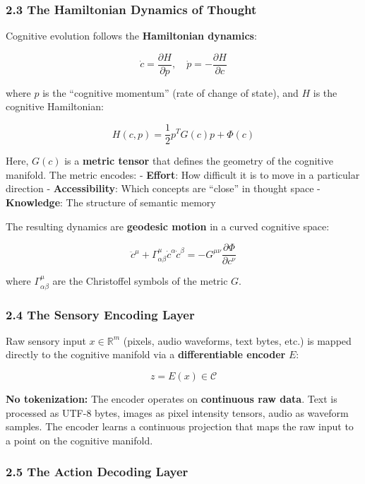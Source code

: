 \documentclass[
  11pt,
  a4paper,
]{article}
\begin{document}
\subsubsection{2.3 The Hamiltonian Dynamics of
Thought}\label{the-hamiltonian-dynamics-of-thought}

Cognitive evolution follows the \textbf{Hamiltonian dynamics}:

\[\dot{c} = \frac{\partial H}{\partial p}, \quad \dot{p} = -\frac{\partial H}{\partial c}\]

where \(p\) is the ``cognitive momentum'' (rate of change of state), and
\(H\) is the cognitive Hamiltonian:

\[H(c, p) = \frac{1}{2} p^T G(c) p + \Phi(c)\]

Here, \(G(c)\) is a \textbf{metric tensor} that defines the geometry of
the cognitive manifold. The metric encodes: - \textbf{Effort}: How
difficult it is to move in a particular direction -
\textbf{Accessibility}: Which concepts are ``close'' in thought space -
\textbf{Knowledge}: The structure of semantic memory

The resulting dynamics are \textbf{geodesic motion} in a curved
cognitive space:

\[\ddot{c}^\mu + \Gamma^\mu_{\alpha\beta} \dot{c}^\alpha \dot{c}^\beta = -G^{\mu\nu} \frac{\partial \Phi}{\partial c^\nu}\]

where \(\Gamma^\mu_{\alpha\beta}\) are the Christoffel symbols of the
metric \(G\).

\subsubsection{2.4 The Sensory Encoding
Layer}\label{the-sensory-encoding-layer}

Raw sensory input \(x \in \mathbb{R}^m\) (pixels, audio waveforms, text
bytes, etc.) is mapped directly to the cognitive manifold via a
\textbf{differentiable encoder} \(E\):

\[z = E(x) \in \mathcal{C}\]

\textbf{No tokenization:} The encoder operates on \textbf{continuous raw
data}. Text is processed as UTF-8 bytes, images as pixel intensity
tensors, audio as waveform samples. The encoder learns a continuous
projection that maps the raw input to a point on the cognitive manifold.

\subsubsection{2.5 The Action Decoding
Layer}\label{the-action-decoding-layer}
\end{document}
